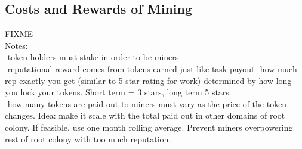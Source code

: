 \subsection{Costs and Rewards of Mining}\label{subsec:mining-costs-and-rewards}
FIXME\\
Notes:\\
-token holders must stake in order to be miners\\
-reputational reward comes from tokens earned just like task payout
-how much rep exactly you get (similar to 5 star rating for work) determined by how long you lock your tokens. Short term = 3 stars, long term 5 stars.\\
-how many tokens are paid out to miners must vary as the price of the token changes. Idea: make it scale with the total paid out in other domains of root colony. If feasible, use one month rolling average. Prevent miners overpowering rest of root colony with too much reputation.
